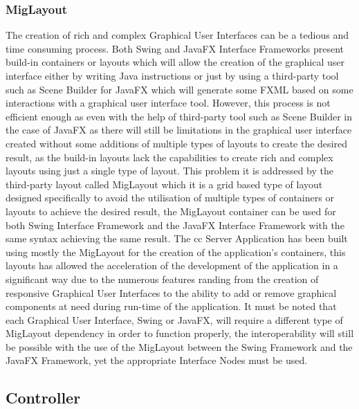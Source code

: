 \newpage

\subsubsection{MigLayout}

The creation of rich and complex Graphical User Interfaces can be a tedious and time
consuming process. Both Swing and JavaFX Interface Frameworks present build-in containers
or layouts which will allow the creation of the graphical user interface either by writing
Java instructions or just by using a third-party tool such as Scene Builder for JavaFX
which will generate some FXML based on some interactions with a graphical
user interface tool. However, this process is not efficient enough as even with the help of
third-party tool such as Scene Builder in the case of JavaFX as there will still
be limitations in the graphical user interface created without some additions of multiple
types of layouts to create the desired result, as the build-in layouts lack the capabilities to create
rich and complex layouts using just a single type of layout. This problem it is addressed
by the third-party layout called MigLayout which it is a grid based type of layout designed
specifically to avoid the utilisation of multiple types of containers or layouts to achieve
the desired result, the MigLayout container can be used for both Swing Interface Framework
and the JavaFX Interface Framework with the same syntax achieving the same result.
The \acrfull{cc} Server Application has been built using mostly the MigLayout for the
creation of the application's containers, this layouts has allowed the acceleration of
the development of the application in a significant way due to the numerous features
randing from the creation of responsive Graphical User Interfaces to the ability to
add or remove graphical components at need during run-time of the application.
It must be noted that each Graphical User Interface, Swing or JavaFX, will require
a different type of MigLayout dependency in order to function properly,
the interoperability will still be possible with the use of the MigLayout between
the Swing Framework and the JavaFX Framework, yet the appropriate Interface Nodes
must be used.

\subsection{Controller}


